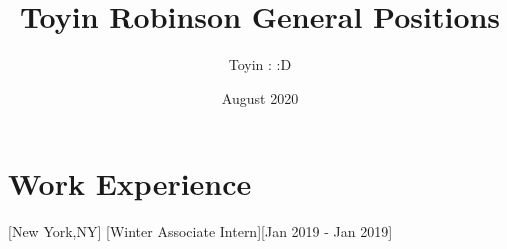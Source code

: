 \documentclass{article}
\title{Toyin Robinson General Positions}
\author{Toyin : :D}
\date{August 2020}
\begin{document}

\makecvtitle %

\section{Work Experience}

[New York,NY]
[Winter Associate Intern][Jan 2019 - Jan 2019]
\end{document}
